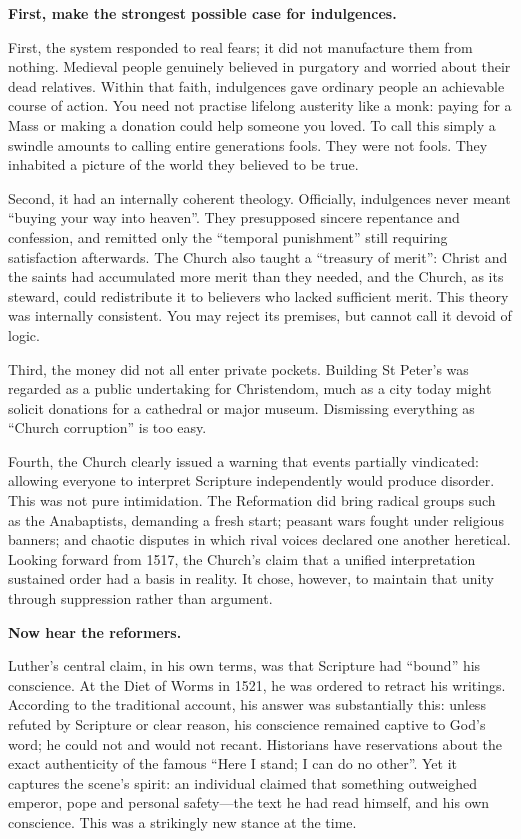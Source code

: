 \textbf{First, make the strongest possible case for indulgences.}

First, the system responded to real fears; it did not manufacture them from nothing. Medieval people genuinely believed in purgatory and worried about their dead relatives. Within that faith, indulgences gave ordinary people an achievable course of action. You need not practise lifelong austerity like a monk: paying for a Mass or making a donation could help someone you loved. To call this simply a swindle amounts to calling entire generations fools. They were not fools. They inhabited a picture of the world they believed to be true.

Second, it had an internally coherent theology. Officially, indulgences never meant ``buying your way into heaven''. They presupposed sincere repentance and confession, and remitted only the ``temporal punishment'' still requiring satisfaction afterwards. The Church also taught a ``treasury of merit'': Christ and the saints had accumulated more merit than they needed, and the Church, as its steward, could redistribute it to believers who lacked sufficient merit. This theory was internally consistent. You may reject its premises, but cannot call it devoid of logic.

Third, the money did not all enter private pockets. Building St Peter's was regarded as a public undertaking for Christendom, much as a city today might solicit donations for a cathedral or major museum. Dismissing everything as ``Church corruption'' is too easy.

Fourth, the Church clearly issued a warning that events partially vindicated: allowing everyone to interpret Scripture independently would produce disorder. This was not pure intimidation. The Reformation did bring radical groups such as the Anabaptists, demanding a fresh start; peasant wars fought under religious banners; and chaotic disputes in which rival voices declared one another heretical. Looking forward from 1517, the Church's claim that a unified interpretation sustained order had a basis in reality. It chose, however, to maintain that unity through suppression rather than argument.

\textbf{Now hear the reformers.}

Luther's central claim, in his own terms, was that Scripture had ``bound'' his conscience. At the Diet of Worms in 1521, he was ordered to retract his writings. According to the traditional account, his answer was substantially this: unless refuted by Scripture or clear reason, his conscience remained captive to God's word; he could not and would not recant. Historians have reservations about the exact authenticity of the famous ``Here I stand; I can do no other''. Yet it captures the scene's spirit: an individual claimed that something outweighed emperor, pope and personal safety---the text he had read himself, and his own conscience. This was a strikingly new stance at the time.

